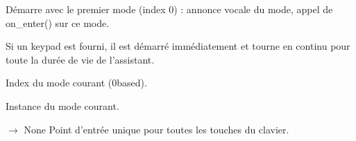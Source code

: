 \documentclass[letterpaper,10pt,french]{sphinxmanual}
\begin{document}
\begin{fulllineitems}
\begin{fulllineitems}
\sphinxAtStartPar
Démarre avec le premier mode (index 0) :
\sphinxhyphen{} annonce vocale du mode,
\sphinxhyphen{} appel de on\_enter() sur ce mode.

\sphinxAtStartPar
Si un keypad est fourni, il est démarré immédiatement et tourne
en continu pour toute la durée de vie de l’assistant.

\end{fulllineitems}


\begin{fulllineitems}
\label{\detokenize{api/core:core.mode_manager.ModeManager.current_index}}
\pysigstartsignatures
\pysigline
{}
\pysigstopsignatures
\sphinxAtStartPar
Index du mode courant (0\sphinxhyphen{}based).

\end{fulllineitems}


\begin{fulllineitems}
\label{\detokenize{api/core:core.mode_manager.ModeManager.current_mode}}
\pysigstartsignatures
\pysigline
{}
\pysigstopsignatures
\sphinxAtStartPar
Instance du mode courant.

\end{fulllineitems}


\begin{fulllineitems}
\label{\detokenize{api/core:core.mode_manager.ModeManager.handle_key_pressed}}
\pysigstartsignatures
\pysiglinewithargsret
{}
{}
{{ $\rightarrow$ None}}
\pysigstopsignatures
\sphinxAtStartPar
Point d’entrée unique pour toutes les touches du clavier.



\end{fulllineitems}
\end{fulllineitems}
\end{document}
